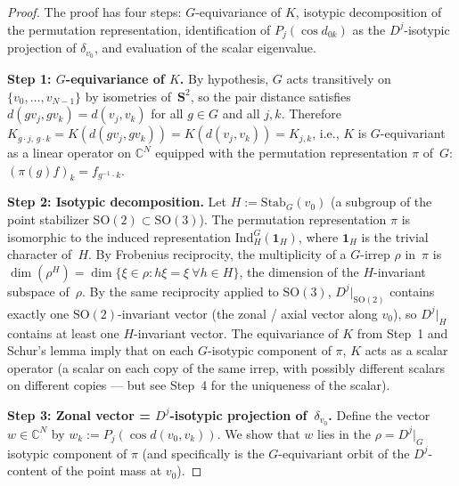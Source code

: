 \begin{proof}
The proof has four steps: $G$-equivariance of $K$, isotypic
decomposition of the permutation representation, identification
of $P_j(\cos d_{0k})$ as the $D^j$-isotypic projection of
$\delta_{v_0}$, and evaluation of the scalar eigenvalue.

\textbf{Step 1: $G$-equivariance of $K$.}
By hypothesis, $G$ acts transitively on $\{v_0, \ldots, v_{N-1}\}$
by isometries of~$\mathbf{S}^2$, so the pair distance satisfies
$d(gv_j, gv_k) = d(v_j, v_k)$ for all $g \in G$ and all $j, k$.
Therefore $K_{g\cdot j,\, g\cdot k} = K(d(gv_j, gv_k))
= K(d(v_j, v_k)) = K_{j, k}$, i.e., $K$ is $G$-equivariant
as a linear operator on $\mathbb{C}^N$ equipped with the
permutation representation $\pi$ of~$G$: $(\pi(g) f)_k
= f_{g^{-1}\cdot k}$.

\textbf{Step 2: Isotypic decomposition.}
Let $H := \mathrm{Stab}_G(v_0)$ (a subgroup of the point
stabilizer $\mathrm{SO}(2) \subset \mathrm{SO}(3)$).  The
permutation representation $\pi$ is isomorphic to the induced
representation $\mathrm{Ind}_H^G(\mathbf{1}_H)$, where
$\mathbf{1}_H$ is the trivial character of~$H$.  By Frobenius
reciprocity, the multiplicity of a $G$-irrep $\rho$ in~$\pi$ is
$\dim(\rho^H) = \dim\{\xi \in \rho : h\xi = \xi\ \forall h \in H\}$,
the dimension of the $H$-invariant subspace of~$\rho$.
By the same reciprocity applied to $\mathrm{SO}(3)$,
$D^j|_{\mathrm{SO}(2)}$ contains exactly one $\mathrm{SO}(2)$-invariant
vector (the zonal / axial vector along $v_0$), so $D^j|_H$
contains at least one $H$-invariant vector.
The equivariance of $K$ from Step~1 and Schur's lemma imply
that on each $G$-isotypic component of $\pi$, $K$ acts as a
scalar operator (a scalar on each copy of the same irrep,
with possibly different scalars on different copies — but
see Step~4 for the uniqueness of the scalar).

\textbf{Step 3: Zonal vector = $D^j$-isotypic projection of~$\delta_{v_0}$.}
Define the vector $w \in \mathbb{C}^N$ by
$w_k := P_j(\cos d(v_0, v_k))$.  We show that $w$ lies in
the $\rho = D^j|_G$ isotypic component of $\pi$ (and specifically
is the $G$-equivariant orbit of the $D^j$-content of the
point mass at $v_0$).


\end{proof}

